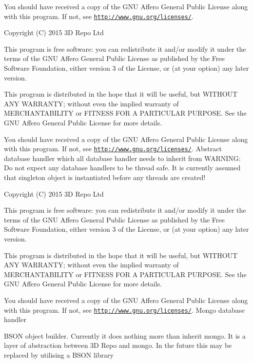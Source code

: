 You should have received a copy of the G\+N\+U Affero General Public License along with this program. If not, see \href{http://www.gnu.org/licenses/}{\tt http\+://www.\+gnu.\+org/licenses/}.

Copyright (C) 2015 3\+D Repo Ltd

This program is free software\+: you can redistribute it and/or modify it under the terms of the G\+N\+U Affero General Public License as published by the Free Software Foundation, either version 3 of the License, or (at your option) any later version.

This program is distributed in the hope that it will be useful, but W\+I\+T\+H\+O\+U\+T A\+N\+Y W\+A\+R\+R\+A\+N\+T\+Y; without even the implied warranty of M\+E\+R\+C\+H\+A\+N\+T\+A\+B\+I\+L\+I\+T\+Y or F\+I\+T\+N\+E\+S\+S F\+O\+R A P\+A\+R\+T\+I\+C\+U\+L\+A\+R P\+U\+R\+P\+O\+S\+E. See the G\+N\+U Affero General Public License for more details.

You should have received a copy of the G\+N\+U Affero General Public License along with this program. If not, see \href{http://www.gnu.org/licenses/}{\tt http\+://www.\+gnu.\+org/licenses/}. Abstract database handler which all database handler needs to inherit from W\+A\+R\+N\+I\+N\+G\+: Do not expect any database handlers to be thread safe. It is currently assumed that singleton object is instantiated before any threads are created!

Copyright (C) 2015 3\+D Repo Ltd

This program is free software\+: you can redistribute it and/or modify it under the terms of the G\+N\+U Affero General Public License as published by the Free Software Foundation, either version 3 of the License, or (at your option) any later version.

This program is distributed in the hope that it will be useful, but W\+I\+T\+H\+O\+U\+T A\+N\+Y W\+A\+R\+R\+A\+N\+T\+Y; without even the implied warranty of M\+E\+R\+C\+H\+A\+N\+T\+A\+B\+I\+L\+I\+T\+Y or F\+I\+T\+N\+E\+S\+S F\+O\+R A P\+A\+R\+T\+I\+C\+U\+L\+A\+R P\+U\+R\+P\+O\+S\+E. See the G\+N\+U Affero General Public License for more details.

You should have received a copy of the G\+N\+U Affero General Public License along with this program. If not, see \href{http://www.gnu.org/licenses/}{\tt http\+://www.\+gnu.\+org/licenses/}. Mongo database handler

B\+S\+O\+N object builder. Currently it does nothing more than inherit mongo. It is a layer of abstraction between 3\+D Repo and mongo. In the future this may be replaced by utilising a B\+S\+O\+N library

